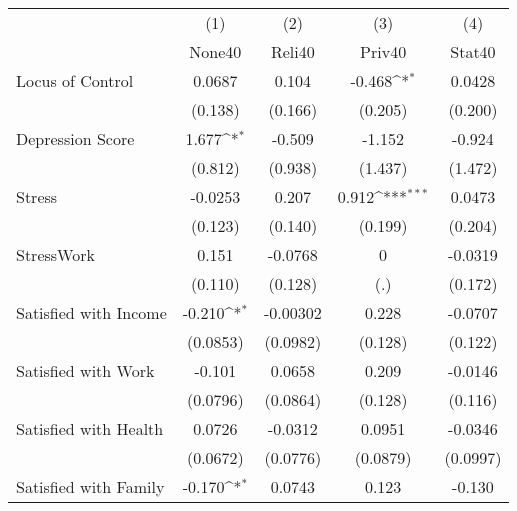 {
\def\sym#1{\ifmmode^{#1}\else\(^{#1}\)\fi}
\begin{tabular}{l*{4}{c}}
\hline\hline
            &\multicolumn{1}{c}{(1)}&\multicolumn{1}{c}{(2)}&\multicolumn{1}{c}{(3)}&\multicolumn{1}{c}{(4)}\\
            &\multicolumn{1}{c}{None40}&\multicolumn{1}{c}{Reli40}&\multicolumn{1}{c}{Priv40}&\multicolumn{1}{c}{Stat40}\\
\hline
Locus of Control&      0.0687         &       0.104         &      -0.468\sym{*}  &      0.0428         \\
            &     (0.138)         &     (0.166)         &     (0.205)         &     (0.200)         \\
[1em]
Depression Score&       1.677\sym{*}  &      -0.509         &      -1.152         &      -0.924         \\
            &     (0.812)         &     (0.938)         &     (1.437)         &     (1.472)         \\
[1em]
Stress      &     -0.0253         &       0.207         &       0.912\sym{***}&      0.0473         \\
            &     (0.123)         &     (0.140)         &     (0.199)         &     (0.204)         \\
[1em]
StressWork  &       0.151         &     -0.0768         &           0         &     -0.0319         \\
            &     (0.110)         &     (0.128)         &         (.)         &     (0.172)         \\
[1em]
Satisfied with Income&      -0.210\sym{*}  &    -0.00302         &       0.228         &     -0.0707         \\
            &    (0.0853)         &    (0.0982)         &     (0.128)         &     (0.122)         \\
[1em]
Satisfied with Work&      -0.101         &      0.0658         &       0.209         &     -0.0146         \\
            &    (0.0796)         &    (0.0864)         &     (0.128)         &     (0.116)         \\
[1em]
Satisfied with Health&      0.0726         &     -0.0312         &      0.0951         &     -0.0346         \\
            &    (0.0672)         &    (0.0776)         &    (0.0879)         &    (0.0997)         \\
[1em]
Satisfied with Family&      -0.170\sym{*}  &      0.0743         &       0.123         &      -0.130         \\

\end{tabular}}
